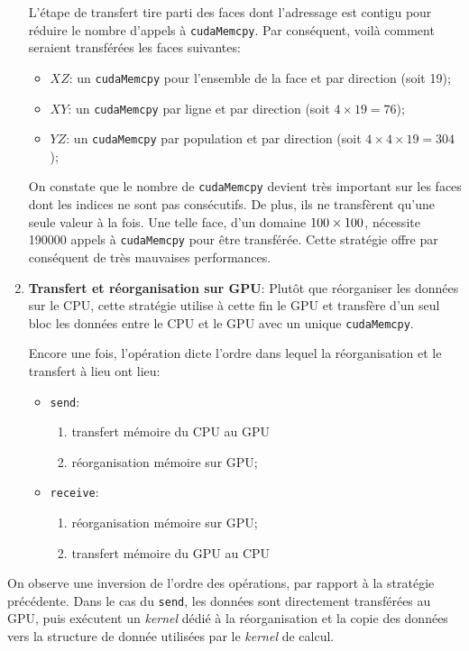\begin{enumerate}
L'étape de transfert tire parti des faces dont l'adressage est contigu pour réduire le nombre d'appels à \texttt{cudaMemcpy}. Par conséquent, voilà comment seraient transférées les faces suivantes:
\begin{itemize}
\item $XZ$: un \texttt{cudaMemcpy} pour l'ensemble de la face et par direction (soit 19);
\item $XY$: un \texttt{cudaMemcpy} par ligne et par direction (soit $4\times19 = 76$);
\item $YZ$: un \texttt{cudaMemcpy} par population et par direction (soit $4\times4\times19 = 304$);
\end{itemize}

On constate que le nombre de \texttt{cudaMemcpy} devient très important sur les faces dont les indices ne sont pas consécutifs. De plus, ils ne transfèrent qu'une seule valeur à la fois. Une telle face, d'un domaine $100\time100\times100$, nécessite 190000 appels à \texttt{cudaMemcpy} pour être transférée. 
Cette stratégie offre par conséquent de très mauvaises performances.

\item \textbf{Transfert et réorganisation sur \ac{GPU}}: Plutôt que réorganiser les données sur le \acs{CPU}, cette stratégie utilise à cette fin le \acs{GPU} et transfère d'un seul bloc les données entre le \acs{CPU} et le \acs{GPU} avec un unique \texttt{cudaMemcpy}.

Encore une fois, l'opération dicte l'ordre dans lequel la réorganisation et le transfert à lieu ont lieu:
\begin{itemize}
	\item \texttt{send}:
	\begin{enumerate}
		\item transfert mémoire du \acs{CPU} au \acs{GPU}
		\item réorganisation mémoire sur \acs{GPU};
	\end{enumerate}
	\item \texttt{receive}:
	\begin{enumerate}
		\item réorganisation mémoire sur \acs{GPU};
		\item transfert mémoire du \acs{GPU} au \acs{CPU}
	\end{enumerate}
\end{itemize}
\end{enumerate}

On observe une inversion de l'ordre des opérations, par rapport à la stratégie précédente. Dans le cas du \texttt{send}, les données sont directement transférées au \acs{GPU}, puis exécutent un \textit{kernel} dédié à la réorganisation et la copie des données vers la structure de donnée utilisées par le \textit{kernel} de calcul.

